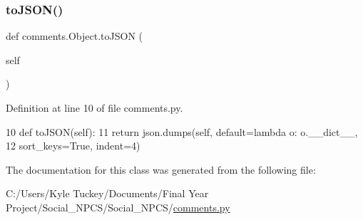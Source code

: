 \subsubsection{\texorpdfstring{to\+J\+S\+O\+N()}{toJSON()}}
{\footnotesize\ttfamily def comments.\+Object.\+to\+J\+S\+ON (\begin{DoxyParamCaption}\item[{}]{self }\end{DoxyParamCaption})}



Definition at line 10 of file comments.\+py.


\begin{DoxyCode}
10     \textcolor{keyword}{def }toJSON(self):
11         \textcolor{keywordflow}{return} json.dumps(self, default=\textcolor{keyword}{lambda} o: o.\_\_dict\_\_, 
12             sort\_keys=\textcolor{keyword}{True}, indent=4)   
\end{DoxyCode}


The documentation for this class was generated from the following file\+:\begin{DoxyCompactItemize}
\item 
C\+:/\+Users/\+Kyle Tuckey/\+Documents/\+Final Year Project/\+Social\+\_\+\+N\+P\+C\+S/\+Social\+\_\+\+N\+P\+C\+S/\hyperlink{comments_8py}{comments.\+py}\end{DoxyCompactItemize}
